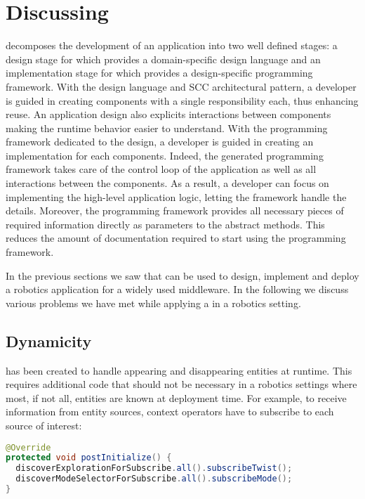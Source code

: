 \section{Discussing}
\label{sec:discussing}

\diaspec{} decomposes the development of an application into two well
defined stages: a design stage for which \diaspec{} provides a
domain-specific design language and an implementation stage for which
\diaspec{} provides a design-specific programming framework. With the
design language and SCC architectural pattern, a developer is guided
in creating components with a single responsibility each, thus
enhancing reuse. An application design also explicits interactions
between components making the runtime behavior easier to understand.
With the programming framework dedicated to the design, a developer is
guided in creating an implementation for each components.
Indeed, the generated programming framework takes care of the control
loop of the application as well as all interactions between the
components. As a result, a developer can focus on implementing the
high-level application logic, letting the framework handle the
details. Moreover, the programming framework provides all necessary
pieces of required information directly as parameters to the abstract
methods. This reduces the amount of documentation required to start
using the programming framework.

In the previous sections we saw that \diaspec{} can be used to design,
implement and deploy a robotics application for a widely used
middleware. In the following we discuss various problems we have met
while applying a\diaspec{} in a robotics setting.

\subsection{\diaspec{} Dynamicity}

\diaspec{} has been created to handle appearing and disappearing
entities at runtime. This requires additional code that should not be
necessary in a robotics settings where most, if not all, entities are
known at deployment time. For example, to receive information from
entity sources, context operators have to subscribe to each source of
interest:

\begin{lstlisting}[language=java]
@Override
protected void postInitialize() {
  discoverExplorationForSubscribe.all().subscribeTwist();
  discoverModeSelectorForSubscribe.all().subscribeMode();
}
\end{lstlisting}

